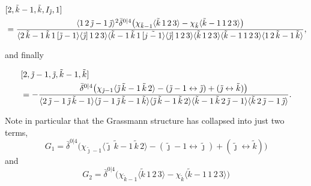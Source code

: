 \documentclass[12pt]{article}
\numberwithin{equation}{section}
\begin{document}
\begin{align}
&[2, \tilde{k}-1, \tilde{k}, I_{\tilde{\jmath}}, 1] \notag \\
&=\frac{\langle 1 \, 2 \, \tilde{\jmath}-1 \, \tilde{\jmath} \rangle^2 \bar{\delta}^{0|4}\bigl(\chi_{\tilde{k}-1} \langle \tilde{k} \, 1 \, 2 \, 3 \rangle - \chi_{\tilde{k}} \langle \tilde{k}-1 \, 1 \, 2 \, 3 \rangle \bigr)}{\langle 2 \, \tilde{k}-1 \, \tilde{k} \, 1 \, [ \tilde{\jmath}-1 \rangle \langle \tilde{\jmath}]\, 1 \, 2 \, 3 \rangle \langle \tilde{k}-1 \, \tilde{k} \, 1 \, [ \tilde{j-1} \rangle \langle \tilde{\jmath}] \, 1 \, 2 \, 3 \rangle \langle \tilde{k} \, 1 \, 2 \, 3 \rangle \langle \tilde{k}-1 \, 1 \, 2 \, 3 \rangle \langle 1 \, 2 \, \tilde{k}-1 \, \tilde{k} \rangle},
\end{align}

and finally

\begin{align}
&[2, \tilde{\jmath}-1, \tilde{\jmath}, \tilde{k}-1, \tilde{k}] \notag \\
&= -\frac{\bar{\delta}^{0|4}\bigl(\chi_{\tilde{\jmath}-1} \langle \tilde{\jmath}  \, \tilde{k}-1 \, \tilde{k} \, 2\rangle - (\tilde{\jmath}-1 \leftrightarrow \tilde{\jmath}) + (\tilde{\jmath} \leftrightarrow \tilde{k})\bigr)}{\langle 2 \, \tilde{\jmath}-1 \, \tilde{\jmath} \, \tilde{k}-1 \rangle \langle \tilde{\jmath}-1 \, \tilde{\jmath} \, \tilde{k}-1 \, \tilde{k} \rangle \langle \tilde{\jmath} \, \tilde{k}-1 \, \tilde{k} \, 2 \rangle \langle \tilde{k}-1 \, \tilde{k} \, 2 \, \tilde{\jmath}-1 \rangle \langle \tilde{k} \,2 \, \tilde{\jmath}-1 \, \tilde{\jmath} \rangle}.
\end{align}

Note in particular that the Grassmann structure has collapsed into just two terms,
\begin{equation}
G_1 = \bar{\delta}^{0|4}\bigl(\chi_{\tilde{\jmath}-1} \langle \tilde{\jmath}  \, \tilde{k}-1 \, \tilde{k} \, 2\rangle - (\tilde{\jmath}-1 \leftrightarrow \tilde{\jmath}) + (\tilde{\jmath} \leftrightarrow \tilde{k})\bigr)
\end{equation}
and
\begin{equation}
G_2 = \bar{\delta}^{0|4}\bigl(\chi_{\tilde{k}-1} \langle \tilde{k} \, 1 \, 2 \, 3 \rangle - \chi_{\tilde{k}} \langle \tilde{k}-1 \, 1 \, 2 \, 3 \rangle \bigr)
\end{equation}
\end{document}
